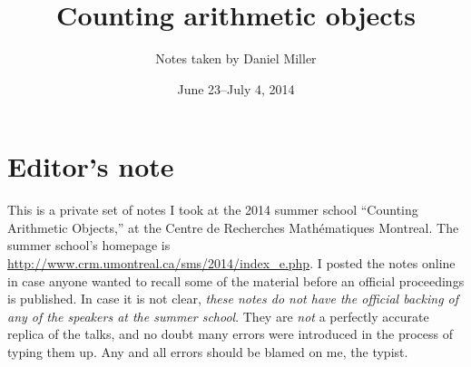 \documentclass{article}
\title{Counting arithmetic objects}
\date{June 23--July 4, 2014}
\author{Notes taken by Daniel Miller}
\theoremstyle{definition}
\begin{document}
\setcounter{tocdepth}{1}
\maketitle
\tableofcontents





\section*{Editor's note}

This is a private set of notes I took at the 2014 summer school 
``Counting Arithmetic Objects,'' at the Centre de Recherches Math\'ematiques 
Montreal. The summer school's homepage is 
\url{http://www.crm.umontreal.ca/sms/2014/index_e.php}. I posted the notes 
online in case anyone wanted to recall some of the material before an official 
proceedings is published. In case it is not clear, \emph{these notes do not 
have the official backing of any of the speakers at the summer school}. They 
are \emph{not} a perfectly accurate replica of the talks, and no doubt many 
errors were introduced in the process of typing them up. Any and all errors 
should be blamed on me, the typist. 















































\end{document}
